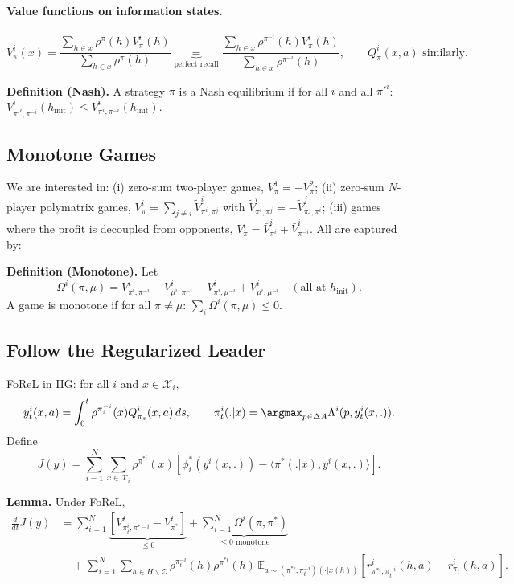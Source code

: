 \paragraph{Value functions on information states.}
$$V^i_{\pi} (x) = \frac{\sum_{h \in x} \rho^{\pi} (h) V^i_{\pi} (h)}{\sum_{h \in x} \rho^{\pi} (h)}\underbrace{=}_{\text{perfect recall}} \frac{\sum_{h \in x} \rho^{\pi^{-i}} (h) V^i_{\pi} (h)}{\sum_{h \in x} \rho^{\pi^{-i}} (h)},\qquad Q^i_{\pi} (x,a) \text{ similarly}.$$

\textbf{Definition (Nash).} A strategy $\pi$ is a Nash equilibrium if for all $i$ and all $\pi'^i$: $V^i_{\pi'^i, \pi^{-i}}(h_{\textrm{init}}) \leq V^i_{\pi^i, \pi^{-i}}(h_{\textrm{init}})$.

\subsection{Monotone Games}
We are interested in: (i) zero-sum two-player games, $V^1_{\pi} = -V^2_{\pi}$; (ii) zero-sum $N$-player polymatrix games, $V^i_{\pi} = \sum_{j \neq i} \tilde V^i_{\pi^i, \pi^j}$ with $\tilde V^i_{\pi^i, \pi^j} = -\tilde V^j_{\pi^j, \pi^i}$; (iii) games where the profit is decoupled from opponents, $V^i_{\pi} = \bar V^i_{\pi^i} + \bar V^i_{\pi^{-i}}$. All are captured by:

\textbf{Definition (Monotone).} Let
$$\Omega^i(\pi, \mu) = V^i_{\pi^i, \pi^{-i}} - V^i_{\mu^i, \pi^{-i}} - V^i_{\pi^i, \mu^{-i}} + V^i_{\mu^i, \mu^{-i}}\quad(\text{all at } h_{\textrm{init}}).$$
A game is monotone if for all $\pi \neq \mu$: $\sum_{i} \Omega^i(\pi, \mu) \leq 0$.

\subsection{Follow the Regularized Leader}
FoReL in IIG: for all $i$ and $x\in\mathcal{X}_i$,
$$y_t^i(x, a) = \int_0^t \rho^{\pi_s^{-i}}(x) Q^i_{\pi_s}(x, a)\, ds,\qquad \pi^i_t(.|x)=\argmax_{p \in \Delta A} \Lambda^i(p, y_t^i(x,.)).$$
Define
$$J(y) = \sum_{i=1}^N \sum_{x \in \mathcal{X}_i} \rho^{\pi^{*i}}(x)\left[\phi_i^*(y^i(x, .)) - \langle \pi^*(.|x), y^i(x, .) \rangle\right].$$

\textbf{Lemma.} Under FoReL,
\begin{align*}
\frac{d}{dt}J(y) &= \sum_{i=1}^N \underbrace{[V^i_{\pi^i_t, \pi^{*-i}} - V^i_{\pi^*}]}_{\leq 0} + \underbrace{\sum_{i=1}^N \Omega^i(\pi, \pi^*)}_{\leq 0 \text{ monotone}}\\
&\quad + \sum_{i=1}^N \sum_{h \in H\backslash\mathcal{Z}} \rho^{\pi_t^{-i}}(h) \rho^{\pi^{*i}}(h) \,\mathbb{E}_{a \sim (\pi^{*i}, \pi_t^{-i})(\cdot|x(h))}\!\left[r^i_{\pi^{*i}, \pi_t^{-i}}(h,a) - r^i_{\pi_t}(h,a)\right].
\end{align*}

